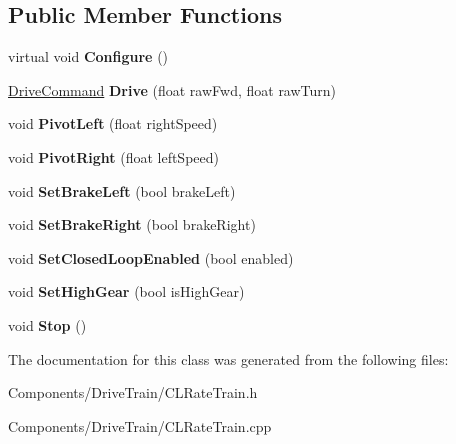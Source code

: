 \subsection*{\-Public \-Member \-Functions}
\begin{DoxyCompactItemize}
\item 
\hypertarget{class_closed_loop_rate_drivetrain_ad6eb50e4d4a03905021086d7a96e5db5}{
virtual void {\bfseries \-Configure} ()}
\label{class_closed_loop_rate_drivetrain_ad6eb50e4d4a03905021086d7a96e5db5}

\item 
\hypertarget{class_closed_loop_rate_drivetrain_a801d380725a11ad07bcada4ef3a0eba8}{
\hyperlink{struct_drive_command}{\-Drive\-Command} {\bfseries \-Drive} (float raw\-Fwd, float raw\-Turn)}
\label{class_closed_loop_rate_drivetrain_a801d380725a11ad07bcada4ef3a0eba8}

\item 
\hypertarget{class_closed_loop_rate_drivetrain_a45c13dc9928e74c15ffda3fda4f1a2c5}{
void {\bfseries \-Pivot\-Left} (float right\-Speed)}
\label{class_closed_loop_rate_drivetrain_a45c13dc9928e74c15ffda3fda4f1a2c5}

\item 
\hypertarget{class_closed_loop_rate_drivetrain_a3680c07a611082644f613461959d7642}{
void {\bfseries \-Pivot\-Right} (float left\-Speed)}
\label{class_closed_loop_rate_drivetrain_a3680c07a611082644f613461959d7642}

\item 
\hypertarget{class_closed_loop_rate_drivetrain_accc3c75eb08de97cfe1ad696308e165b}{
void {\bfseries \-Set\-Brake\-Left} (bool brake\-Left)}
\label{class_closed_loop_rate_drivetrain_accc3c75eb08de97cfe1ad696308e165b}

\item 
\hypertarget{class_closed_loop_rate_drivetrain_a902be59dd02d0e4dbe9acd3410ff9c06}{
void {\bfseries \-Set\-Brake\-Right} (bool brake\-Right)}
\label{class_closed_loop_rate_drivetrain_a902be59dd02d0e4dbe9acd3410ff9c06}

\item 
\hypertarget{class_closed_loop_rate_drivetrain_a11b51c513d4d9256e4a70030ca0e64f6}{
void {\bfseries \-Set\-Closed\-Loop\-Enabled} (bool enabled)}
\label{class_closed_loop_rate_drivetrain_a11b51c513d4d9256e4a70030ca0e64f6}

\item 
\hypertarget{class_closed_loop_rate_drivetrain_a46e77851bb839d5976092559b81c5890}{
void {\bfseries \-Set\-High\-Gear} (bool is\-High\-Gear)}
\label{class_closed_loop_rate_drivetrain_a46e77851bb839d5976092559b81c5890}

\item 
\hypertarget{class_closed_loop_rate_drivetrain_a99bc967f5d769454e044da313c888034}{
void {\bfseries \-Stop} ()}
\label{class_closed_loop_rate_drivetrain_a99bc967f5d769454e044da313c888034}

\end{DoxyCompactItemize}


\-The documentation for this class was generated from the following files\-:\begin{DoxyCompactItemize}
\item 
\-Components/\-Drive\-Train/\-C\-L\-Rate\-Train.\-h\item 
\-Components/\-Drive\-Train/\-C\-L\-Rate\-Train.\-cpp\end{DoxyCompactItemize}
